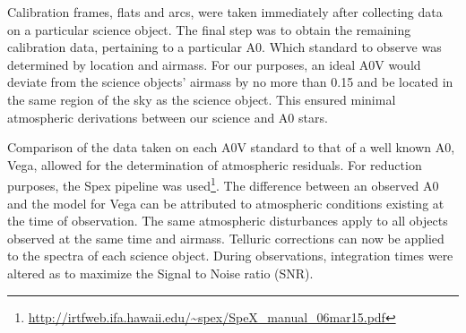 Calibration frames, flats and arcs, were taken immediately after collecting data on a particular science object.  The final step was to obtain the remaining calibration data, pertaining to a particular A0.  Which standard to observe was determined by location and airmass.  For our purposes, an ideal A0V would deviate from the science objects' airmass by no more than 0.15 and be located in the same region of the sky as the science object.  This ensured minimal atmospheric derivations between our science and A0 stars.



Comparison of the data taken on each A0V standard to that of a well known A0, Vega, allowed for the determination of atmospheric residuals.  %
For reduction purposes, the Spex pipeline was used\footnote{\url{http://irtfweb.ifa.hawaii.edu/~spex/SpeX_manual_06mar15.pdf}}.  The difference between an observed A0 and the model for Vega can be attributed to atmospheric conditions existing at the time of observation.  The same atmospheric disturbances apply to all objects observed at the same time and airmass.  Telluric corrections can now be applied to the spectra of each science object.  During observations, integration times were altered as to maximize the Signal to Noise ratio (SNR). \cite{Cushing_2004}\\
